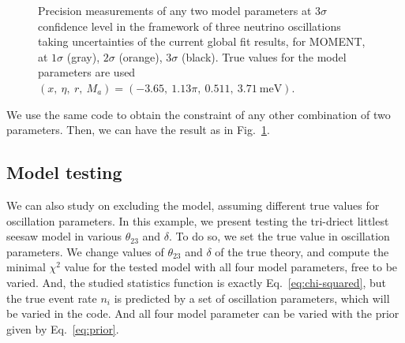 \documentclass[a4paper,11pt]{article}
\begin{document}
\begin{figure}[!h]
 \caption{\label{fig:model_2D}Precision measurements of any two model parameters at 3$\sigma$ confidence level in the framework of three neutrino oscillations taking uncertainties of the current global fit results, for MOMENT, at $1\sigma$ (gray), $2\sigma$ (orange), $3\sigma$ (black). True values for the model parameters are used $(x,~\eta,~r,~M_a)=(-3.65,~1.13\pi,~0.511,~3.71~\text{meV})$.}
\end{figure}


We use the same code to obtain the constraint of any other combination of two parameters. Then, we can have the result as in Fig.~\ref{fig:model_2D}.





\subsection{Model testing}

We can also study on excluding the model, assuming different true values for oscillation parameters. In this example, we present testing the tri-driect littlest seesaw model in various $\theta_{23}$ and $\delta$. To do so, we set the true value in oscillation parameters. We change values of $\theta_{23}$ and $\delta$ of the true theory, and compute the minimal $\chi^2$ value for the tested model with all four model parameters, free to be varied. And, the studied statistics function is exactly Eq.~\ref{eq:chi-squared}, but the true event rate $n_i$ is predicted by a set of oscillation parameters, which will be varied in the code. And all four model parameter can be varied with the prior given by Eq.~\ref{eq:prior}.
\end{document}
